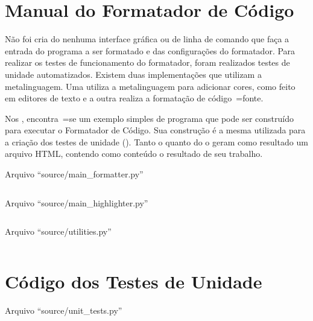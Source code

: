 

\chapter{Manual do Formatador de Código}
\label{manualDoFormatadorDeCodigo}

Não foi cria do nenhuma interface gráfica ou
de linha de comando que faça a entrada do programa a ser formatado e
das configurações do formatador.
Para realizar os testes de funcionamento do formatador,
foram realizados testes de unidade automatizados.
Existem duas implementações que utilizam a metalinguagem.
Uma utiliza a metalinguagem para adicionar cores,
como feito em editores de texto e
a outra realiza a formatação de código~=fonte.

Nos ,
encontra~=se um exemplo simples de programa que pode ser construído para executar o Formatador de Código.
Sua construção é a mesma utilizada para a criação dos testes de unidade ().
Tanto o  quanto do o  geram como resultado um arquivo HTML,
contendo como conteúdo o resultado de seu trabalho.
\begin{code}
\caption{Arquivo ``source/main\_formatter.py''}
\label{mainHighlighterPy}
\inputminted[fontsize=\small,linenos=true,numberblanklines=true,breaklines=true]{python3}{../source/main_formatter.py}
\end{code}
\begin{code}
\caption{Arquivo ``source/main\_highlighter.py''}
\label{mainFormatterPy}
\inputminted[fontsize=\small,linenos=true,numberblanklines=true,breaklines=true]{python3}{../source/main_formatter.py}
\end{code}
\begin{code}
\caption{Arquivo ``source/utilities.py''}
\label{utilitiesPy}
\inputminted[fontsize=\small,linenos=true,numberblanklines=true,breaklines=true]{python3}{../source/utilities.py}
\end{code}


\chapter{Código dos Testes de Unidade}

\begin{code}
\caption{Arquivo ``source/unit\_tests.py''}
\label{unitTestsPy}
\inputminted[fontsize=\small,linenos=true,numberblanklines=true,breaklines=true]{python3}{../source/unit_tests.py}
\end{code}


